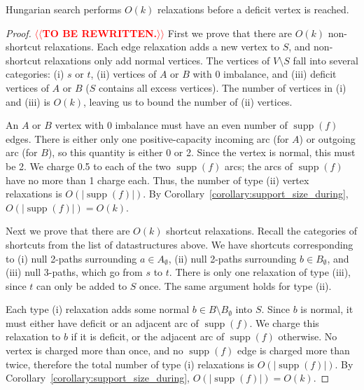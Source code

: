 \documentclass[a4paper,UKenglish]{socg-lipics-v2018}
\makeatletter
\def\note#1{\textcolor{red}{{#1}}}
\def\supp{\operatorname{supp}}
\theoremstyle{plain}
\numberwithin{figure}{section}
\def\n@te#1{\textsf{\boldmath \textbf{$\langle\!\langle$#1$\rangle\!\rangle$}}\leavevmode}
\def\note#1{\textcolor{red}{\n@te{#1}}}
\makeatother
\begin{document}
\begin{toappendix}

\begin{lemmarep}
\label{lemma:goldberg_hs_length}
Hungarian search performs $O(k)$ relaxations before a deficit vertex is reached.
\end{lemmarep}

\begin{proof}
\note{TO BE REWRITTEN.}
First we prove that there are $O(k)$ non-shortcut relaxations.
%
Each edge relaxation adds a new vertex to $S$, and non-shortcut relaxations
only add normal vertices.
The vertices of $V \setminus S$ fall into several categories:
(i) $s$ or $t$, (ii) vertices of $A$ or $B$ with 0 imbalance, and (iii)
deficit vertices of $A$ or $B$ ($S$ contains all excess vertices).
The number of vertices in (i) and (iii) is $O(k)$, leaving us to bound the
number of (ii) vertices.

An $A$ or $B$ vertex with 0 imbalance must have an even number of $\supp(f)$
edges.
There is either only one positive-capacity incoming arc (for $A$) or outgoing
arc (for $B$), so this quantity is either 0 or 2.
Since the vertex is normal, this must be 2.
We charge 0.5 to each of the two $\supp(f)$ arcs; the arcs of $\supp(f)$
have no more than 1 charge each.
Thus, the number of type (ii) vertex relaxations is $O(|\supp(f)|)$.
By Corollary~\ref{corollary:support_size_during}, $O(|\supp(f)|) = O(k)$.

Next we prove that there are $O(k)$ shortcut relaxations.
%
Recall the categories of shortcuts from the list of datastructures above.
We have shortcuts corresponding to (i) null 2-paths surrounding
$a \in A_\emptyset$, (ii) null 2-paths surrounding $b \in B_\emptyset$, and
(iii) null 3-paths, which go from $s$ to $t$.
%
There is only one relaxation of type (iii), since $t$ can only be added to $S$
once.
The same argument holds for type (ii).

Each type (i) relaxation adds some normal $b \in B \setminus B_\emptyset$
into $S$.
Since $b$ is normal, it must either have deficit or an adjacent arc of
$\supp(f)$.
We charge this relaxation to $b$ if it is deficit, or the adjacent arc of
$\supp(f)$ otherwise.
No vertex is charged more than once, and no $\supp(f)$ edge is charged more
than twice, therefore the total number of type (i) relaxations is
$O(|\supp(f)|)$.
By Corollary~\ref{corollary:support_size_during}, $O(|\supp(f)|) = O(k)$.
\end{proof}


\end{toappendix}
\end{document}
